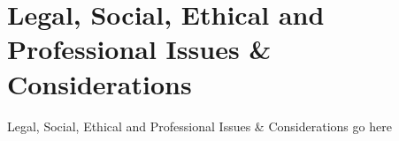 
\section{Legal, Social, Ethical and Professional Issues \& Considerations}
\label{sec:IssuesAndConsiderations}

\large{\raggedright
Legal, Social, Ethical and Professional Issues & Considerations go here\\
}
